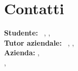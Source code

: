 \section*{Contatti}
\textbf{Studente:} \nomeStudente\ \cognomeStudente, \href{mailto:\emailStudente}{\emailStudente}, \telStudente \\
\textbf{Tutor aziendale:} \nomeTutorAziendale\ \cognomeTutorAziendale, \href{mailto:\emailTutorAziendale}{\emailTutorAziendale}, \telTutorAziendale \\
\textbf{Azienda:} \ragioneSocAzienda,\\ \indirizzoAzienda, \href{\sitoAzienda}{\sitoAzienda}